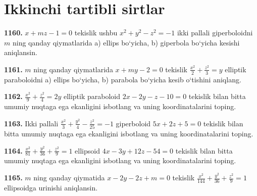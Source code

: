 \section{Ikkinchi tartibli sirtlar}



\textbf{1160.} $x+m z-1=0$ tekislik ushbu $x^2+y^2-z^2=-1$ ikki pallali giperboloidni $m$ ning qanday qiymatlarida a) ellips bo‘yicha, b) giperbola bo‘yicha kesishi aniqlansin.

\textbf{1161.} $m$ ning qanday qiymatlarida $x+m y-2=0$ tekislik $\frac{x^2}{2}+\frac{z^2}{3}=y$ elliptik paraboloidni a) ellips bo‘yicha, b) parabola bo‘yicha kesib o‘tishini aniqlang.

\textbf{1162.} $\frac{x^2}{9}+\frac{z^2}{4}=2 y$ elliptik paraboloid $2 x-2 y-z-10=0$ tekislik bilan bitta umumiy nuqtaga ega ekanligini isbotlang va uning koordinatalarini toping.

\textbf{1163.} Ikki pallali $\frac{x^2}{3}+\frac{y^2}{4}-\frac{z^2}{25}=-1$ giperboloid $5 x+2 z+5=0$ tekislik bilan bitta umumiy nuqtaga ega ekanligini isbotlang va uning koordinatalarini toping.

\textbf{1164.} $\frac{x^2}{81}+\frac{y^2}{36}+\frac{z^2}{9}=1$ ellipsoid $4 x-3 y+12 z-54=0$ tekislik bilan bitta umumiy nuqtaga ega ekanligini isbotlang va uning koordinatalarini toping.

\textbf{1165.} $m$ ning qanday qiymatida $x-2 y-2 z+m=0$ tekislik $\frac{x^2}{144}+\frac{y^2}{36}+\frac{z^2}{9}=1$ ellipsoidga urinishi aniqlansin.